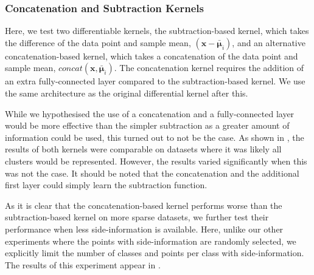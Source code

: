 \documentclass[../thesis.tex]{subfiles}
\begin{document}
\subsubsection{Concatenation and Subtraction Kernels}\label{sec__DMS__ablation_sub_cat_kernels}

Here, we test two differentiable kernels, the subtraction-based kernel,
which takes the difference of the data point and sample mean, $(\mathbf{x} - \bar{\boldsymbol{\mu}}_i)$, and an alternative concatenation-based kernel, which takes a concatenation of the data point and sample mean, $concat(\mathbf{x}, \bar{\boldsymbol{\mu}}_i)$.
The concatenation kernel requires the addition of an extra fully-connected layer compared to the subtraction-based kernel. We use the same architecture as the original differential kernel after this. 

While we hypothesised the use of a concatenation and a fully-connected layer would be more effective than the simpler subtraction as a greater amount of information could be used, this turned out to not be the case. As shown in , the results of both kernels were comparable on datasets where it was likely all clusters would be represented. However, the results varied significantly when this was not the case. It should be noted that the concatenation and the additional first layer could simply learn the subtraction function. 


    \begin{table}
        \centering        
        \caption{The performance of our differentiable kernel with varied training iterations on the YTF dataset.}
    \label{table__DMS__ablation_training_iteration}
    \end{table}
    
    \begin{table}
        \centering        
        
        \caption{The performance of our differentiable kernel with a varied number of fully connected layers on the YTF dataset.}
    \label{table__DMS__ablation_fully_connected}
    \end{table}
    

As it is clear that the concatenation-based kernel performs worse than the subtraction-based kernel on more sparse datasets, we further test their performance when less side-information is available. 
Here, unlike our other experiments where the points with side-information are randomly selected, we explicitly limit the number of classes and points per class with side-information.
The results of this experiment appear in . 
\end{document}
